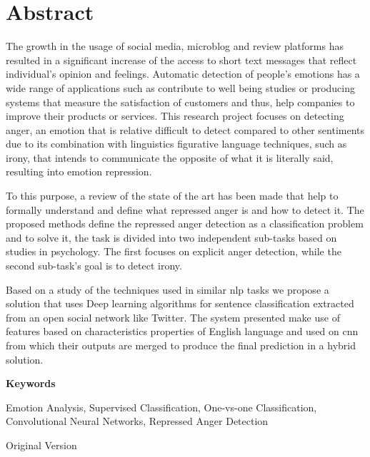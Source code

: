 \chapter*{Abstract}

The growth in the usage of social media, microblog and review platforms has resulted in a significant increase of the access to short text messages that reflect individual's opinion and feelings. Automatic detection of people's emotions has a wide range of applications such as contribute to well being studies or producing systems that measure the satisfaction of customers and thus, help companies to improve their products or services. This research project focuses on detecting anger, an emotion that is relative difficult to detect compared to other sentiments due to its combination with linguistics figurative language techniques, such as irony, that intends to communicate the opposite of what it is literally said, resulting into emotion repression.

To this purpose, a review of the state of the art has been made that help to formally understand and define what repressed anger is and how to detect it. The proposed methods define the repressed anger detection as a classification problem and to solve it, the task is divided into two independent sub-tasks based on studies in psychology. The first focuses on explicit anger detection, while the second sub-task's goal is to detect irony. 

Based on a study of the techniques used in similar \acrshort{nlp} tasks we propose a solution that uses Deep learning algorithms for sentence classification extracted from an open social network like Twitter. The system presented make use of features based on characteristics properties of English language and used on \acrlong{cnn} from which their outputs are merged to produce the final prediction in a hybrid solution.

\vspace{2em}

{\Large\bfseries\sffamily Keywords}
\vspace{3\medskipamount}

Emotion Analysis, Supervised Classification, One-vs-one Classification, Convolutional Neural Networks, Repressed Anger Detection

\iffalse

Original Version

